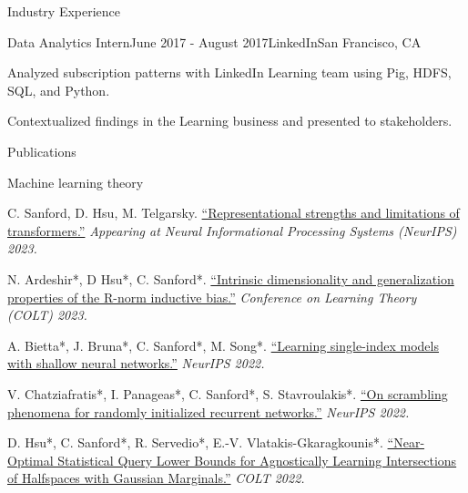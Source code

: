 \documentclass{cv} %
\begin{document}
\begin{rSection}{Industry Experience}
\begin{rSubsection}{Data Analytics Intern}{June 2017 - August 2017}{LinkedIn}{San Francisco, CA}
\item Analyzed subscription patterns with LinkedIn Learning team using Pig, HDFS, SQL, and Python.
\item Contextualized findings in the Learning business and presented to stakeholders.
\end{rSubsection}

\end{rSection}


\begin{rSection}{Publications}
\begin{rSubsection}{Machine learning theory}{}{}{}{}
\item C. Sanford, D. Hsu, M. Telgarsky. \href{https://arxiv.org/abs/2306.02896}{``Representational strengths and limitations of transformers.''} \textit{Appearing at Neural Informational Processing Systems (NeurIPS) 2023.}

\item N. Ardeshir*, D Hsu*, C. Sanford*. \href{https://proceedings.mlr.press/v195/ardeshir23a.html}{``Intrinsic dimensionality and generalization properties of the R-norm inductive bias.''} \textit{Conference on Learning Theory (COLT) 2023.}

\item A. Bietta*, J. Bruna*, C. Sanford*, M. Song*. \href{https://proceedings.neurips.cc/paper_files/paper/2022/hash/3fb6c52aeb11e09053c16eabee74dd7b-Abstract-Conference.html}{``Learning single-index models with shallow neural networks.''} \textit{NeurIPS 2022.}

\item V. Chatziafratis*, I. Panageas*, C. Sanford*, S. Stavroulakis*. \href{https://proceedings.neurips.cc/paper_files/paper/2022/hash/755acd0c7c07180d78959b6d89768207-Abstract-Conference.html}{``On scrambling phenomena for randomly initialized recurrent networks.''} \textit{NeurIPS 2022.}

\item D. Hsu*, C. Sanford*, R. Servedio*, E.-V. Vlatakis-Gkaragkounis*. \href{https://proceedings.mlr.press/v178/hsu22a.html}{``Near-Optimal Statistical Query Lower Bounds for Agnostically Learning Intersections of Halfspaces with Gaussian Marginals.''} \textit{COLT 2022.}


\end{rSubsection}
\end{rSection}
\end{document}
